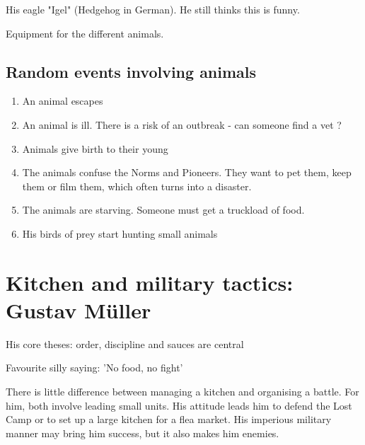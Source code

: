 \begin{npcBox}[title=Jonas Ohnesorg]
    \begin{consequences}
    \item {}
    \item {}
    \item {}
    \end{consequences}

    \begin{equipment}
    \item His eagle "Igel" (Hedgehog in German). He still thinks this is funny.
    \item Equipment for the different animals.
    \end{equipment}
\end{npcBox}


\subsection{Random events involving animals}

\begin{enumerate}
\item An animal escapes
\item An animal is ill. There is a risk of an outbreak - can someone find a vet ?
\item Animals give birth to their young
\item The animals confuse the Norms and Pioneers. They want to pet them, keep them or film them, which often turns into a disaster.
\item The animals are starving. Someone must get a truckload of food.
\item His birds of prey start hunting small animals
\end{enumerate}

\newpage
\section{Kitchen and military tactics: Gustav Müller}

His core theses: order, discipline and sauces are central

Favourite silly saying: 'No food, no fight'

There is little difference between managing a kitchen and organising a battle. For him, both involve leading small units. His attitude leads him to defend the Lost Camp or to set up a large kitchen for a flea market. His imperious military manner may bring him success, but it also makes him enemies.


